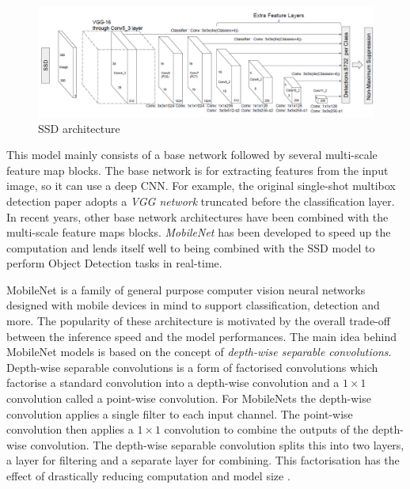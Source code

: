 \begin{figure}
\centerline{\includegraphics[scale=0.45]{images/chapter_2/ssd_network.png}}
\caption{SSD architecture \citep[from][]{liu2016ssd}}
\label{fig:ssd_architecture}
\end{figure}

This model mainly consists of a base network followed by several multi-scale feature map blocks. The base network is for extracting features from the input image, so it can use a deep CNN. For example, the original single-shot multibox detection paper adopts a \textit{VGG network} \citep{simonyan2014very} truncated before the classification layer. In recent years, other base network architectures have been combined with the multi-scale feature maps blocks. \textit{MobileNet} has been developed to speed up the computation and lends itself well to being combined with the SSD model to perform Object Detection tasks in real-time.  

MobileNet \citep{howard2017mobilenets, sandler2018mobilenetv2, howard2019searching} is a family of general purpose computer vision neural networks designed with mobile devices in mind to support classification, detection and more. The popularity of these architecture is motivated by the overall trade-off between the inference speed and the model performances.
The main idea behind MobileNet models is based on the concept of \textit{depth-wise separable convolutions}. Depth-wise separable convolutions is a form of factorised convolutions which factorise a standard convolution into a depth-wise convolution and a $1\times1$ convolution called a point-wise convolution. For MobileNets the depth-wise convolution applies a single filter to each input channel. The point-wise convolution then applies a $1\times1$ convolution to combine the outputs of the depth-wise convolution. The depth-wise separable convolution splits this into two layers, a layer for filtering and a separate layer for combining. This factorisation has the effect of drastically reducing computation and model size \citep{howard2017mobilenets}. 

